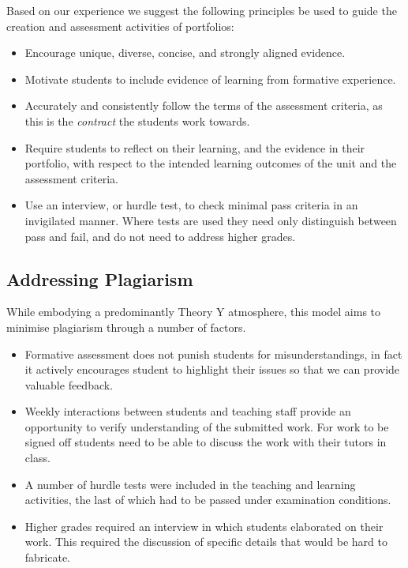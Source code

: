 Based on our experience we suggest the following principles be used to guide the creation and assessment activities of portfolios:
\begin{itemize}[noitemsep,nolistsep]
  \item Encourage unique, diverse, concise, and strongly aligned evidence.
  \item Motivate students to include evidence of learning from formative experience.
  \item Accurately and consistently follow the terms of the assessment criteria, as this is the \emph{contract} the students work towards.
  \item Require students to reflect on their learning, and the evidence in their portfolio, with respect to the intended learning outcomes of the unit and the assessment criteria.
  \item Use an interview, or hurdle test, to check minimal pass criteria in an invigilated manner. Where tests are used they need only distinguish between pass and fail, and do not need to address higher grades. 
\end{itemize}


\subsection{Addressing Plagiarism} %
\label{sub:addressing_plagiarism}

While embodying a predominantly Theory Y atmosphere, this model aims to minimise plagiarism through a number of factors.
\begin{itemize}[noitemsep,nolistsep]
	\item Formative assessment does not punish students for misunderstandings, in fact it actively encourages student to highlight their issues so that we can provide valuable feedback. 
	\item Weekly interactions between students and teaching staff provide an opportunity to verify understanding of the submitted work. For work to be signed off students need to be able to discuss the work with their tutors in class.
	\item A number of hurdle tests were included in the teaching and learning activities, the last of which had to be passed under examination conditions.
	\item Higher grades required an interview in which students elaborated on their work. This required the discussion of specific details that would be hard to fabricate.
\end{itemize}

